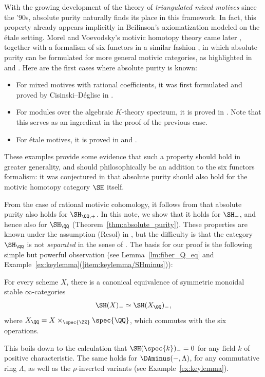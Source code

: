 With the growing development of the theory of \emph{triangulated mixed motives} since the '90s, absolute purity naturally finds its place in this framework.
In fact, this property already appears implicitly in Beilinson's axiomatization modeled on the étale setting. Morel and Voevodsky's motivic homotopy theory came later \cite{MV}, together with a formalism of six functors in a similar fashion \cite{AyoubThesis}, in which absolute purity can be formulated for more general motivic categories, as highlighted in \cite[A.2]{CDEtale} and \cite[4.3]{DJK}.
Here are the first cases where absolute purity is known:
\begin{itemize}
\item For mixed motives with rational coefficients, it was first formulated and proved by Cisinski--Déglise in \cite[Th.\,14.4.1]{CD3}.
\item For modules over the algebraic $K$-theory spectrum, it is proved in \cite[Th.\,13.6.3]{CD3}. Note that this serves as an ingredient in the proof of the previous case.
\item For étale motives, it is proved in \cite{AyoubEt} and \cite{CD5}.
\end{itemize}
These examples provide some evidence that such a property should hold in greater generality, and should philosophically be an addition to the six functors formalism: it was conjectured in \cite{DegliseOrientation} that absolute purity should also hold for the motivic homotopy category $\SH$ itself.

From the case of rational motivic cohomology, it follows from \cite[Th.\,16.2.13]{CD3} that absolute purity also holds for $\SH_{\QQ,+}$.
In this note, we show that it holds for $\SH_{-}$, and hence also for $\SH_{\QQ}$ (Theorem~\ref{thm:absolute_purity}).
These properties are known under the assumption (Resol) in \cite[2.4.1]{BD1}, but the difficulty is that the category $\SH_\QQ$ is not \emph{separated} in the sense of \cite[Def.\,2.1.7]{CD3}.
The basis for our proof is the following simple but powerful observation (see Lemma~\ref{lm:fiber_Q_eq} and Example~\ref{ex:keylemma}(\ref{item:keylemma/SHminus})):

\begin{lmi}
For every scheme $X$, there is a canonical equivalence of symmetric monoidal stable $\infty$-categories
\[
\SH(X)_- \simeq \SH(X_\QQ)_-,
\]
where $X_\QQ = X \times_{\spec{\ZZ}} \spec{\QQ}$, which commutes with the six operations.
\end{lmi}

This boils down to the calculation that $\SH(\spec{k})_- = 0$ for any field $k$ of positive characteristic.
The same holds for $\DAminus(-, \Lambda)$, for any commutative ring $\Lambda$, as well as the $\rho$-inverted variants (see Example~\ref{ex:keylemma}).

